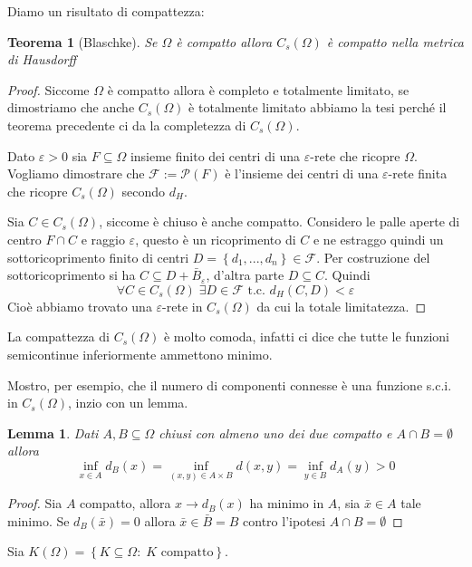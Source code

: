 \documentclass[a4paper,10pt]{article}
\newcounter{counter1}
\theoremstyle{plain}
\newtheorem{myteo}[counter1]{Teorema}
\newtheorem{mylem}[counter1]{Lemma}
\theoremstyle{definition}
\theoremstyle{remark}
\newcommand{\set}[1]{\left\{#1\right\}}
\begin{document}
Diamo un risultato di compattezza:
\begin{myteo}[Blaschke{\cite[Teorema 4.4.6]{ambrosio2000selected}}]
  Se $\Omega$ è compatto allora $C_s(\Omega)$ è compatto nella metrica
  di Hausdorff
\end{myteo}
\begin{proof}
  Siccome $\Omega$ è compatto allora è completo e totalmente limitato,
  se dimostriamo che anche $C_s(\Omega)$ è totalmente limitato abbiamo
  la tesi perché il teorema precedente ci da la completezza di
  $C_s(\Omega)$.

  Dato $\varepsilon >0$ sia $F\subseteq \Omega$ insieme finito dei centri di
  una $\varepsilon$-rete che ricopre $\Omega$. Vogliamo dimostrare che
  $\mathcal{F}:= \mathcal{P}(F)$ è l'insieme dei centri di una
  $\varepsilon$-rete finita che ricopre $C_s(\Omega)$ secondo $d_H$.

  Sia $C\in C_s(\Omega)$, siccome è chiuso è anche compatto. Considero
  le palle aperte di centro $F\cap C$ e raggio $\varepsilon$, questo è
  un ricoprimento di $C$ e ne estraggo quindi un sottoricoprimento
  finito di centri $D=\set{d_1,...,d_n} \in \mathcal{F}$. Per
  costruzione del sottoricoprimento si ha $C \subseteq D +
  \bar B_\varepsilon$, d'altra parte $D \subseteq C$. Quindi
  \[ \forall C \in C_s(\Omega)\; \exists D \in \mathcal{F}\text{ t.c. }
  d_H(C,D) < \varepsilon \]
  Cioè abbiamo trovato una $\varepsilon$-rete in $C_s(\Omega)$ da cui la
  totale limitatezza.
\end{proof}

La compattezza di $C_s(\Omega)$ è molto comoda, infatti ci dice che
tutte le funzioni semicontinue inferiormente ammettono minimo.

Mostro, per esempio, che il numero di componenti connesse è una
funzione s.c.i. in $C_s(\Omega)$, inzio con un lemma.

\begin{mylem}
  Dati $A,B \subseteq \Omega$ chiusi con almeno uno dei due compatto e
  $A \cap B = \emptyset$ allora
  \[ \inf _{x\in A} d_B(x) = \inf _{(x,y) \in A\times B} d(x,y) = \inf
  _{y\in B} d_A(y) >0 \]
\end{mylem}
\begin{proof}
  Sia $A$ compatto, allora $x \to d_B(x)$ ha minimo in $A$, sia $\bar
  x \in A$ tale minimo. Se $d_B(\bar x) = 0$ allora $\bar x \in \bar B = B$
  contro l'ipotesi $A \cap B = \emptyset$
\end{proof}

Sia $K(\Omega) = \set{K\subseteq \Omega :\; K \text{ compatto}}$.
\end{document}
